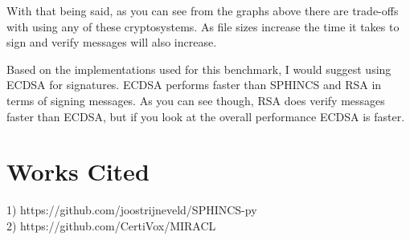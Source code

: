 \documentclass[12pt,a4paper]{article}
\begin{document}
With that being said, as you can see from the graphs above there are trade-offs with using any of these cryptosystems. As file sizes increase the time it takes to sign and verify messages will also increase. 

Based on the implementations used for this benchmark, I would suggest using ECDSA for signatures. ECDSA performs faster than SPHINCS and RSA in terms of signing messages. As you can see though, RSA does verify messages faster than ECDSA, but if you look at the overall performance ECDSA is faster.

\section*{Works Cited}
1) https://github.com/joostrijneveld/SPHINCS-py \\
2) https://github.com/CertiVox/MIRACL
\end{document}
